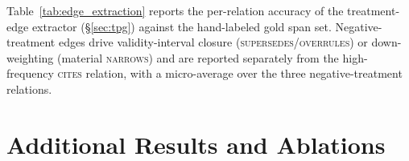 Table~\ref{tab:edge_extraction} reports the per-relation accuracy of the treatment-edge extractor (\S\ref{sec:tpg}) against the hand-labeled gold span set. Negative-treatment edges drive validity-interval closure (\textsc{supersedes}/\textsc{overrules}) or down-weighting (material \textsc{narrows}) and are reported separately from the high-frequency \textsc{cites} relation, with a micro-average over the three negative-treatment relations.

\begin{table}[h]
\centering
\caption{Treatment-edge extraction accuracy against the 600 hand-labeled gold citation spans (\S\ref{sec:tpg}).}
\label{tab:edge_extraction}
\small
\setlength{\tabcolsep}{5pt}
\end{table}

\section{Additional Results and Ablations}
\label{app:retriever}

\begin{table}[h]
\centering
\caption{Severity-label agreement on the full held-out test set, including retained pre-labels (RQ1; point estimates, reported for scale). B5 is matched to ALERT's mean iteration budget (not to total LLM calls or tokens).}
\label{tab:rq1}
\small
{}
\end{table}


